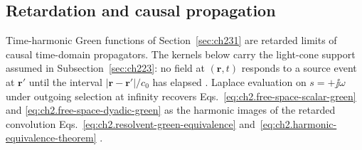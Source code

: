 \subsection{Retardation and causal propagation}
\label{sec:ch233}
Time-harmonic Green functions of Section~\ref{sec:ch231} are retarded limits of causal
time-domain propagators. The kernels below carry the light-cone support assumed in
Subsection~\ref{sec:ch223}: no field at $(\mathbf{r},t)$ responds to a source event at
$\mathbf{r}'$ until the interval $|\mathbf{r}-\mathbf{r}'|/c_0$ has elapsed
\cite{stratton1941,sommerfeld1949}. Laplace evaluation on $s=+\jj\omega$ under outgoing
selection at infinity recovers Eqs.~\eqref{eq:ch2.free-space-scalar-green} and
\eqref{eq:ch2.free-space-dyadic-green} as the harmonic images of the retarded convolution
Eqs.~\eqref{eq:ch2.resolvent-green-equivalence} and~\eqref{eq:ch2.harmonic-equivalence-theorem}
\cite{harrington2001}.


